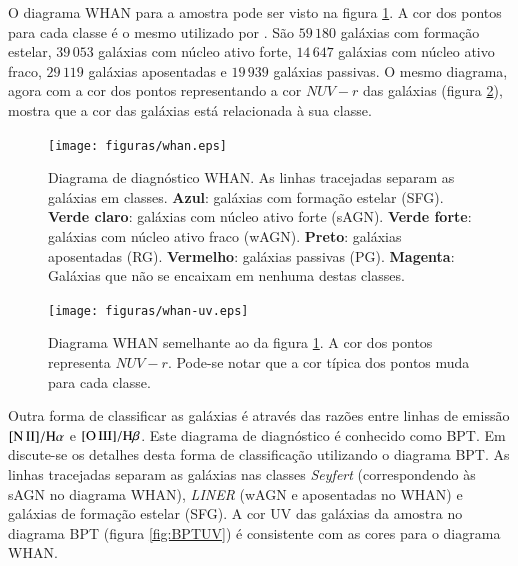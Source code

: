 O diagrama WHAN para a amostra \starlightUV pode ser visto na figura
\ref{fig:Whan}. A cor dos pontos para cada classe é o mesmo utilizado por
\citet{CidFernandes2011}. São $59\,180$ galáxias com formação estelar, $39\,053$
galáxias com núcleo ativo forte, $14\,647$ galáxias com núcleo ativo fraco,
$29\,119$ galáxias aposentadas e $19\,939$ galáxias passivas. O mesmo diagrama,
agora com a cor dos pontos representando a cor $NUV-r$ das galáxias (figura
\ref{fig:WhanUV}), mostra que a cor das galáxias está relacionada à sua classe.

\begin{figure}
	\texttt{[image: figuras/whan.eps]}
	\caption[Diagrama de diagnóstico WHAN.]
	{Diagrama de diagnóstico WHAN. As linhas tracejadas separam as galáxias
	em classes. \textbf{Azul}: galáxias com formação estelar (SFG). \textbf{Verde
	claro}: galáxias com núcleo ativo forte (sAGN). \textbf{Verde forte}:
	galáxias com núcleo ativo fraco (wAGN). \textbf{Preto}: galáxias aposentadas
	(RG). \textbf{Vermelho}: galáxias passivas (PG). \textbf{Magenta}: Galáxias
	que não se encaixam em nenhuma destas classes.}
	\label{fig:Whan}
\end{figure}

\begin{figure}
	\texttt{[image: figuras/whan-uv.eps]}
	\caption[Cores ultravioleta no diagrama WHAN.]
	{Diagrama WHAN semelhante ao da figura \ref{fig:Whan}. A cor dos pontos
	representa $NUV-r$. Pode-se notar que a cor típica dos pontos muda para cada
	classe.}
	\label{fig:WhanUV}
\end{figure}

Outra forma de classificar as galáxias é através das razões entre linhas de
emissão $\nII/\Halpha$ e $\oIII/\Hbeta$. Este diagrama de diagnóstico é
conhecido como BPT. Em \citet{CidFernandes2010} discute-se os detalhes desta
forma de classificação utilizando o diagrama BPT. As linhas tracejadas separam
as galáxias nas classes {\em Seyfert} (correspondendo às sAGN no diagrama WHAN),
{\em LINER} (wAGN e aposentadas no WHAN) e galáxias de formação estelar (SFG). A
cor UV das galáxias da amostra no diagrama BPT (figura \ref{fig:BPTUV}) é
consistente com as cores para o diagrama WHAN.

